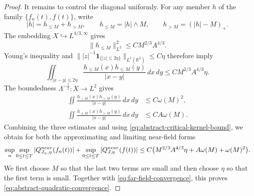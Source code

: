\documentclass[10pt,a4paper]{amsart}
\newcommand{\R}{\mathbb R}
\newcommand{\dd}{\,d}
\newcommand{\one}{\mathbf 1}
\begin{document}
\begin{proof}
It remains to control the diagonal uniformly.  For any member $h$ of the
family $\{f_n(t),f(t)\}$, write
\[
  |h|=h_{\leq M}+h_{>M},
  \qquad
  h_{\leq M}=|h|\wedge M,
  \qquad
  h_{>M}=(|h|-M)_+.
\]
The embedding $X\hookrightarrow L^{4/3,\infty}$ 
gives
\[
  \|h_{\leq M}\|_{L^2}^2
  \leq C M^{2/3}A^{4/3}.
\]
Young's inequality and
$\||z|^{-1}\one_{\{|z|\leq2\eta\}}\|_{L^1(\R^2)}\leq C\eta$ therefore
imply
\begin{equation}\label{eq:near-bounded-part}
 \iint_{|x-y|\leq2\eta}
 \frac{h_{\leq M}(x)h_{\leq M}(y)}{|x-y|}\dd x\dd y
 \leq C M^{2/3}A^{4/3}\eta.
\end{equation}
The boundedness $\Lambda^{-\frac{1}{2}}:X\to L^2$ gives
\begin{align}
 \iint\frac{h_{>M}(x)h_{>M}(y)}{|x-y|}\dd x\dd y
 &\leq C\omega(M)^2,
 \label{eq:near-high-part}\\
 \iint\frac{h_{\leq M}(x)h_{>M}(y)}{|x-y|}\dd x\dd y
 &\leq C A\omega(M).
 \label{eq:near-mixed-part}
\end{align}
Combining the three estimates and using
\eqref{eq:abstract-critical-kernel-bound}, we obtain for both the
approximating and limiting near-field forms
\begin{equation}\label{eq:near-small}
 \sup_n\sup_{0\leq t\leq T}|Q_{J_n,\eta}^{\rm near}(f_n(t))|
 +\sup_{0\leq t\leq T}|Q_{J,\eta}^{\rm near}(f(t))|
 \leq C\bigl(M^{2/3}A^{4/3}\eta+A\omega(M)+\omega(M)^2\bigr).
\end{equation}
We first choose $M$ so that the last two terms are small and then choose $\eta$
so that the first term is small.  Together with
\eqref{eq:far-field-convergence}, this proves
\eqref{eq:abstract-quadratic-convergence}.
\end{proof}
\end{document}
